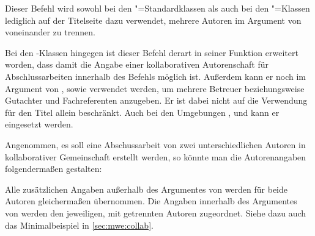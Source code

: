 \documentclass[%
  english,ngerman,%
  headings=optiontoheadandtoc,captions=tableheading,numbers=noenddot,%
  chapterpage,cdfoot,%
]{tudscrman}
\begin{document}
\begin{Declaration}{}
\printdeclarationlist%
%
%
Dieser Befehl wird sowohl bei den "=Standardklassen als auch bei 
den \KOMAScript"=Klassen lediglich auf der Titelseite dazu verwendet, mehrere 
Autoren im Argument von  voneinander zu trennen.

Bei den \TUDScript-Klassen hingegen ist dieser Befehl derart in seiner Funktion 
erweitert worden, dass damit die Angabe einer kollaborativen Autorenschaft für 
Abschlussarbeiten innerhalb des Befehls  möglich ist. Außerdem 
kann er noch im Argument von ,  sowie 
 verwendet werden, um mehrere Betreuer beziehungsweise Gutachter 
und Fachreferenten anzugeben. Er ist dabei nicht auf die Verwendung für den 
Titel allein beschränkt. Auch bei den Umgebungen , 
 und  kann er eingesetzt werden.
%
\begin{Example}
Angenommen, es soll eine Abschussarbeit von zwei unterschiedlichen Autoren in 
kollaborativer Gemeinschaft erstellt werden, so könnte man die Autorenangaben 
folgendermaßen gestalten:
\begin{code}
\author{%
  Mickey Mouse
\and%
  Donald Duck
}
\end{code}
Alle zusätzlichen Angaben außerhalb des Argumentes von  werden 
für beide Autoren gleichermaßen übernommen. Die Angaben innerhalb des Argumentes 
von  werden den jeweiligen, mit  getrennten Autoren 
zugeordnet. Siehe dazu auch das Minimalbeispiel in \autoref{sec:mwe:collab}.
\end{Example}
\end{Declaration}
\end{document}
